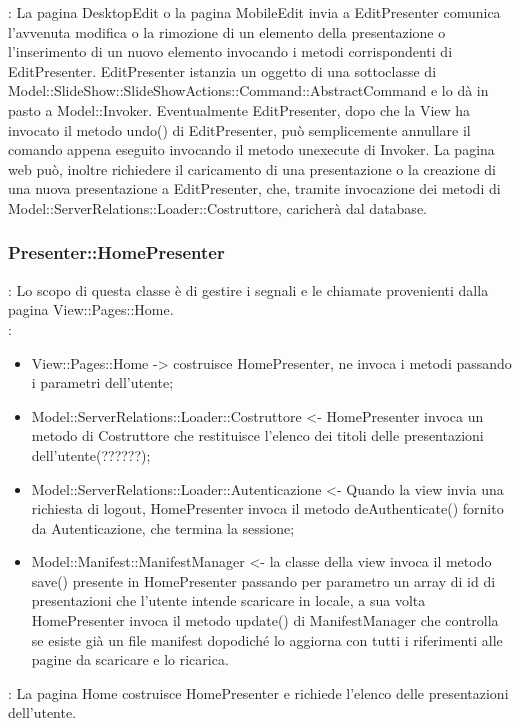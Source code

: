 {{\begin{itemize}
		\end{itemize} 
		\textbf{\interfacce}: La pagina DesktopEdit o la pagina MobileEdit invia a EditPresenter comunica l’avvenuta modifica o la rimozione di un elemento della presentazione o l’inserimento di un nuovo elemento invocando i metodi corrispondenti di EditPresenter. EditPresenter istanzia un oggetto di una sottoclasse di Model::SlideShow::SlideShowActions::Command::AbstractCommand e lo dà in pasto a Model::Invoker. Eventualmente EditPresenter, dopo che la View ha invocato il metodo undo() di EditPresenter, può semplicemente annullare il comando appena eseguito invocando il metodo unexecute di Invoker.
		La pagina web può, inoltre richiedere il caricamento di una presentazione o la creazione di una nuova presentazione a EditPresenter, che, tramite invocazione dei metodi di Model::ServerRelations::Loader::Costruttore, caricherà dal database.
		\\
	}
	\subsubsection{Presenter::HomePresenter}{
				\textbf{\tipo}: Lo scopo di questa classe è di gestire i segnali e le chiamate provenienti dalla pagina View::Pages::Home.\\	
				\textbf{\relaz}:
				\begin{itemize}
					\item View::Pages::Home -> costruisce HomePresenter, ne invoca i metodi passando i parametri dell’utente;
					\item Model::ServerRelations::Loader::Costruttore <- HomePresenter invoca un metodo di Costruttore che restituisce l’elenco dei titoli delle presentazioni dell’utente(??????);
					\item Model::ServerRelations::Loader::Autenticazione <- Quando la view invia una richiesta di logout, HomePresenter invoca il metodo deAuthenticate() fornito da Autenticazione, che termina la sessione;
					\item Model::Manifest::ManifestManager <- la classe della view invoca il metodo save() presente in  HomePresenter passando per parametro un array di id di presentazioni che l'utente intende scaricare in locale, a sua volta HomePresenter invoca il metodo update() di ManifestManager che controlla se esiste già un file manifest dopodiché lo aggiorna con tutti i riferimenti alle pagine da scaricare e lo ricarica. 					
				\end{itemize} 
				\textbf{\interfacce}: La pagina Home costruisce HomePresenter e richiede l’elenco delle presentazioni dell’utente.\\
			}
}

